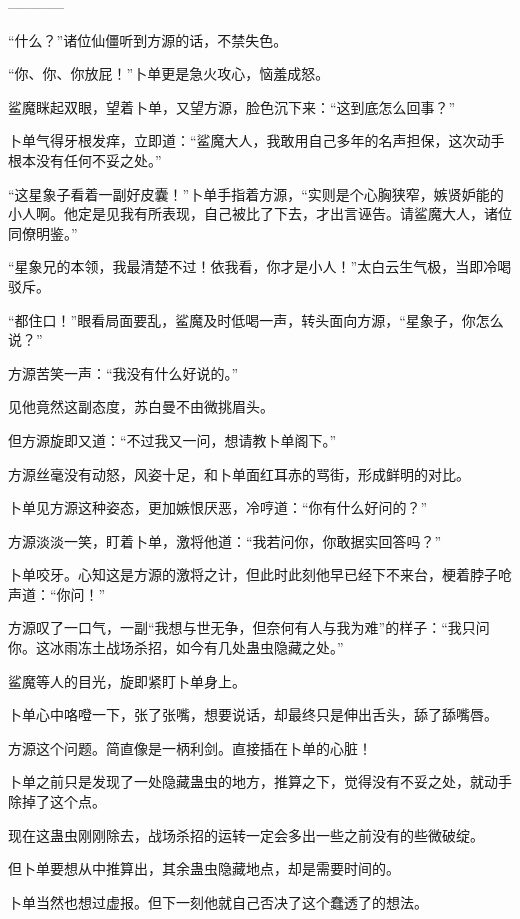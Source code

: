 
\begin{this_body}

------------

“什么？”诸位仙僵听到方源的话，不禁失色。

“你、你、你放屁！”卜单更是急火攻心，恼羞成怒。

鲨魔眯起双眼，望着卜单，又望方源，脸色沉下来：“这到底怎么回事？”

卜单气得牙根发痒，立即道：“鲨魔大人，我敢用自己多年的名声担保，这次动手根本没有任何不妥之处。”

“这星象子看着一副好皮囊！”卜单手指着方源，“实则是个心胸狭窄，嫉贤妒能的小人啊。他定是见我有所表现，自己被比了下去，才出言诬告。请鲨魔大人，诸位同僚明鉴。”

“星象兄的本领，我最清楚不过！依我看，你才是小人！”太白云生气极，当即冷喝驳斥。

“都住口！”眼看局面要乱，鲨魔及时低喝一声，转头面向方源，“星象子，你怎么说？”

方源苦笑一声：“我没有什么好说的。”

见他竟然这副态度，苏白曼不由微挑眉头。

但方源旋即又道：“不过我又一问，想请教卜单阁下。”

方源丝毫没有动怒，风姿十足，和卜单面红耳赤的骂街，形成鲜明的对比。

卜单见方源这种姿态，更加嫉恨厌恶，冷哼道：“你有什么好问的？”

方源淡淡一笑，盯着卜单，激将他道：“我若问你，你敢据实回答吗？”

卜单咬牙。心知这是方源的激将之计，但此时此刻他早已经下不来台，梗着脖子呛声道：“你问！”

方源叹了一口气，一副“我想与世无争，但奈何有人与我为难”的样子：“我只问你。这冰雨冻土战场杀招，如今有几处蛊虫隐藏之处。”

鲨魔等人的目光，旋即紧盯卜单身上。

卜单心中咯噔一下，张了张嘴，想要说话，却最终只是伸出舌头，舔了舔嘴唇。

方源这个问题。简直像是一柄利剑。直接插在卜单的心脏！

卜单之前只是发现了一处隐藏蛊虫的地方，推算之下，觉得没有不妥之处，就动手除掉了这个点。

现在这蛊虫刚刚除去，战场杀招的运转一定会多出一些之前没有的些微破绽。

但卜单要想从中推算出，其余蛊虫隐藏地点，却是需要时间的。

卜单当然也想过虚报。但下一刻他就自己否决了这个蠢透了的想法。


\end{this_body}
